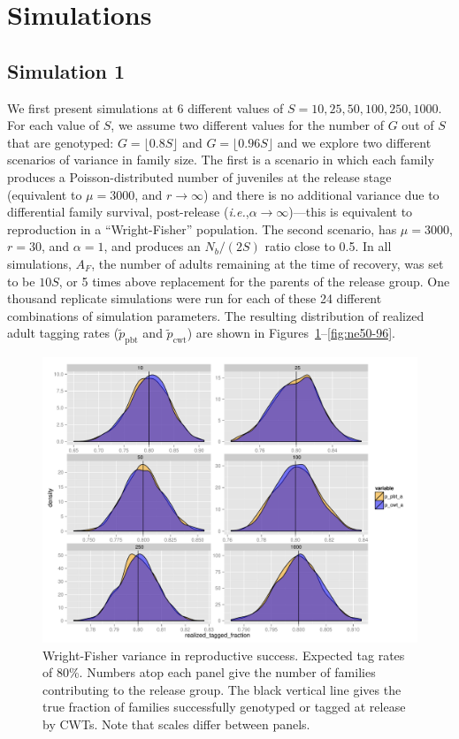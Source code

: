 \documentclass[11pt]{article}
\newcommand{\ie}{{\em i.e.},\xspace }
\begin{document}
\section{Simulations}
\subsection{Simulation 1}
We first present simulations at 6 different values of $S = 10, 25, 50, 100, 250, 1000$.  For each value of $S$,
we assume two different values for the number of $G$ out of $S$ that are genotyped: $G = \lfloor 0.8 S \rfloor$ and
$G = \lfloor 0.96 S \rfloor$ and 
we explore two different scenarios of variance in family size. The first is a scenario in which each family
produces a Poisson-distributed number of
juveniles at the release stage (equivalent to $\mu=3000$, and $r\rightarrow\infty$) and there is no
additional variance due to differential family 
survival, post-release (\ie $\alpha \rightarrow \infty$)---this is equivalent to reproduction in
a ``Wright-Fisher'' population. The second scenario, has
$\mu = 3000$, $r = 30$, and $\alpha = 1$, and produces an $N_b/(2S)$ ratio close to
0.5.  In all simulations, $A_F$, the number of adults remaining at the time of recovery, was set to 
be $10S$, or 5 times above replacement for the parents of the release group. One thousand replicate simulations were run for each of these 24 different combinations of simulation parameters. The resulting distribution of realized adult tagging
rates ($\tilde{p}_\mathrm{pbt}$ and $\tilde{p}_\mathrm{cwt}$)
are shown in Figures~\ref{fig:wf80}--\ref{fig:ne50-96}.


\begin{figure}
\includegraphics[width = \textwidth]{images/tag_fracts_80_WrightFisher.pdf}
\caption{Wright-Fisher variance in reproductive success. Expected tag rates of 80\%. Numbers
atop each panel give the number of families contributing to the release group. The black vertical line
gives the true fraction of families successfully genotyped or tagged at release by CWTs. Note that
scales differ between panels.}
\label{fig:wf80}
\end{figure}
\end{document}
